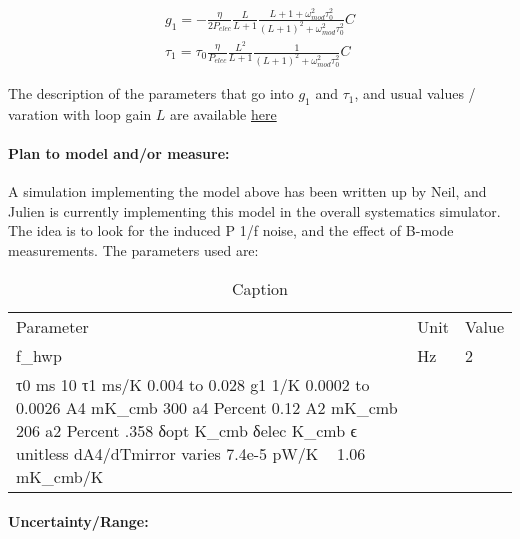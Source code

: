 \begin{align}
g_1 = -\frac{\eta}{2 P_{elec}} \frac{L}{L+1} \frac{L+1+\omega_{mod}^2 \tau_0^2}{(L+1)^2 + \omega_{mod}^2 \tau_0^2} C \\
\tau_1 = \tau_0 \frac{\eta}{P_{elec}} \frac{L^2}{L+1} \frac{1}{(L+1)^2 + \omega_{mod}^2 \tau_0^2} C
\end{align}

\noindent The description of the parameters that go into $g_1$ and $\tau_1$, and usual values / varation with loop gain $L$ are available \href{http://simonsobservatory.wdfiles.com/local--files/calandsys-telecon/hwp_systematics_pipeline_2017-05-17.pdf?ukey=b7162749d5391f6bfc1b0d7e0ed84ab97c96f6a8}{here}
  
\paragraph{Plan to model and/or measure:}
A simulation implementing the model above has been written up by Neil, and Julien is currently implementing this model in the overall systematics simulator. The idea is to look for the induced P 1/f noise, and the effect of B-mode measurements. The parameters used are:

\begin{table}[h]
\caption{Caption}
\label{table:chapter:label}
\begin{center}       
\begin{tabular}{lll}
\hline
Parameter & Unit & Value \\
f_{hwp} & Hz & 2 \\
τ0  ms  10
τ1  ms/K    0.004 to 0.028
g1  1/K 0.0002 to 0.0026
A4  mK_cmb  300
a4  Percent 0.12
A2  mK_cmb  206
a2  Percent .358
δopt    K_cmb   
δelec   K_cmb   
ϵ   unitless    
dA4/dTmirror    varies  7.4e-5 pW/K ~ 1.06 mK_cmb/K
\hline
\end{tabular}
\end{center}
\end{table}


\paragraph{Uncertainty/Range:}


